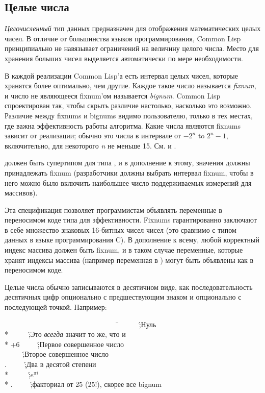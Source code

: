 \subsection{Целые числа}
\label{INTEGERS-SECTION}

\emph{Целочисленный} тип данных предназначен для отображения
математических целых чисел. В отличие от большинства языков
программирования, Common Lisp принципиально не навязывает
ограничений на величину целого числа.
Место для хранения больших чисел выделяется автоматически по мере
необходимости.

В каждой реализации Common Lisp'а есть интервал целых чисел,
которые хранятся более оптимально, чем другие. Каждое такое число
называется \emph{fixnum}, и число не являющееся fixnum'ом называется
\emph{bignum}. Common Lisp спроектирован так, чтобы скрыть различие настолько,
насколько это возможно. Различие между fixnums и bignums видимо
пользователю, только в тех местах, где важна эффективность работы
алгоритма. Какие числа являются fixnums зависит от реализации;
обычно это числа в интервале от $-2^{n}$ to
$2^{n}-1$, включительно, для некоторого \emph{n} не меньше
15. См.  и . 

 должен быть супертипом для типа , 
и в дополнение к этому, значения  должны
принадлежать fixnum (разработчики должны выбрать интервал fixnum,
чтобы в него можно было включить наибольшее число поддерживаемых
измерений для массивов). 

\beforenoterule
\begin{rationale}
Эта спецификация позволяет программистам объявлять
переменные в переносимом коде типа  для
эффективности. Fixnums гарантированно заключают в себе множество
знаковых 16-битных чисел чисел (это сравнимо с типом
данных  в языке программирования C). В дополнение к
всему, любой корректный индекс массива должен быть fixnum, и в
таком случае переменные, которые хранят индексы массива (например
переменная в ) могут быть объявлены как  в
переносимом коде. 
\end{rationale}
\afternoterule

Целые числа обычно записываются в десятичном виде, как последовательность
десятичных цифр опционально с предшествующим знаком и опционально с последующей
точкой. Например:
\begin{lisp}
~~~~~~~~~~~~~~~~~~~~~~~~~~~~~~~~\=\kill
{}~~~~~\';\textrm{Нуль} \\*
~~~~~\';\textrm{Это \emph{всегда} значит то же, что и } \\*
\>+6~~~~~\';\textrm{Первое совершенное число} \\
~~~~~\';\textrm{Второе совершенное число} \\
.~~~~~\';\textrm{Два в десятой степени} \\*
~~~~~\';\textrm{$e^{\pi i}$} \\*
.~~~~~\';\textrm{факториал от 25 (25!),
скорее все bignum}
\end{lisp}

